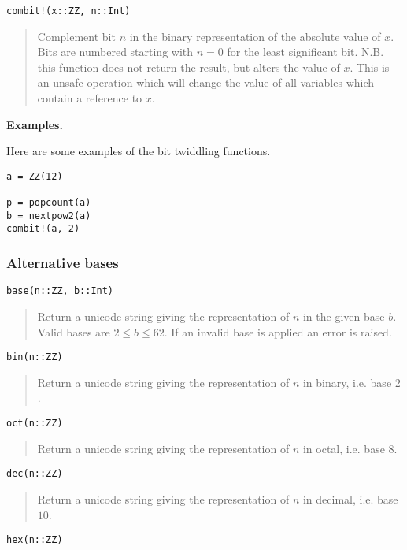 \documentclass[a4paper,10pt]{article}
\newcommand{\desc}[1]{\vspace{-3mm}\begin{quote}#1\end{quote}}
\begin{document}
{{{\begin{lstlisting}
combit!(x::ZZ, n::Int)
\end{lstlisting}

\desc{Complement bit $n$ in the binary representation of the absolute value of $x$. Bits
are numbered starting with $n = 0$ for the least significant bit. N.B. this function does
not return the result, but alters the value of $x$. This is an unsafe operation which will
change the value of all variables which contain a reference to $x$.}

\textbf{Examples.}

Here are some examples of the bit twiddling functions.

\begin{lstlisting}
a = ZZ(12)

p = popcount(a)
b = nextpow2(a)
combit!(a, 2)
\end{lstlisting}

\subsubsection{Alternative bases}

\begin{lstlisting}
base(n::ZZ, b::Int)
\end{lstlisting}

\desc{Return a unicode string giving the representation of $n$ in the given base $b$. Valid
bases are $2 \leq b \leq 62$. If an invalid base is applied an error is raised.}

\begin{lstlisting}
bin(n::ZZ)
\end{lstlisting}

\desc{Return a unicode string giving the representation of $n$ in binary, i.e. base $2$.}

\begin{lstlisting}
oct(n::ZZ)
\end{lstlisting}

\desc{Return a unicode string giving the representation of $n$ in octal, i.e. base $8$.}

\begin{lstlisting}
dec(n::ZZ)
\end{lstlisting}

\desc{Return a unicode string giving the representation of $n$ in decimal, i.e. base $10$.}

\begin{lstlisting}
hex(n::ZZ)
\end{lstlisting}

}}}
\end{document}
